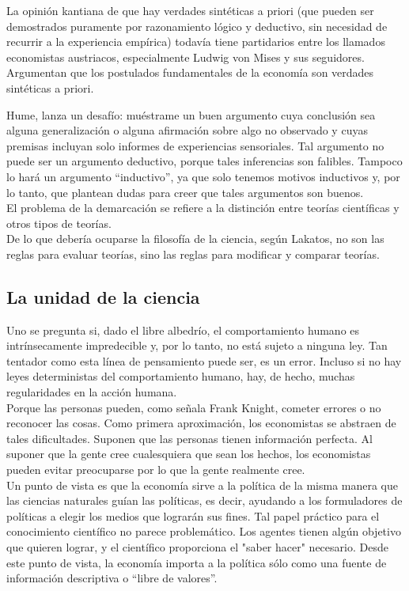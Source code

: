 La opinión kantiana de que hay verdades sintéticas a priori (que pueden ser demostrados puramente por razonamiento lógico y deductivo, sin necesidad de recurrir a la experiencia empírica) todavía tiene partidarios entre los llamados economistas austriacos, especialmente Ludwig von Mises y sus seguidores. Argumentan que los postulados fundamentales de la economía son verdades sintéticas a priori. 

Hume, lanza un desafío: muéstrame un buen argumento cuya conclusión sea alguna generalización o alguna afirmación sobre algo no observado y cuyas premisas incluyan solo informes de experiencias sensoriales. Tal argumento no puede ser un argumento deductivo, porque tales inferencias son falibles. Tampoco lo hará un argumento “inductivo”, ya que solo tenemos motivos inductivos y, por lo tanto, que plantean dudas para creer que tales argumentos son buenos.\\

El problema de la demarcación se refiere a la distinción entre teorías científicas y otros tipos de teorías.\\

De lo que debería ocuparse la filosofía de la ciencia, según Lakatos, no son las reglas para evaluar teorías, sino las reglas para modificar y comparar teorías.

\subsection{La unidad de la ciencia}
Uno se pregunta si, dado el libre albedrío, el comportamiento humano es intrínsecamente impredecible y, por lo tanto, no está sujeto a ninguna ley. Tan tentador como esta línea de pensamiento puede ser, es un error. Incluso si no hay leyes deterministas del comportamiento humano, hay, de hecho, muchas regularidades en la acción humana.\\

Porque las personas pueden, como señala Frank Knight, cometer errores o no reconocer las cosas. Como primera aproximación, los economistas se abstraen de tales dificultades. Suponen que las personas tienen información perfecta. Al suponer que la gente cree cualesquiera que sean los hechos, los economistas pueden evitar preocuparse por lo que la gente realmente cree.\\

Un punto de vista es que la economía sirve a la política de la misma manera que las ciencias naturales guían las políticas, es decir, ayudando a los formuladores de políticas a elegir los medios que lograrán sus fines. Tal papel práctico para el conocimiento científico no parece problemático. Los agentes tienen algún objetivo que quieren lograr, y el científico proporciona el "saber hacer" necesario. Desde este punto de vista, la economía importa a la política sólo como una fuente de información descriptiva o “libre de valores”.

